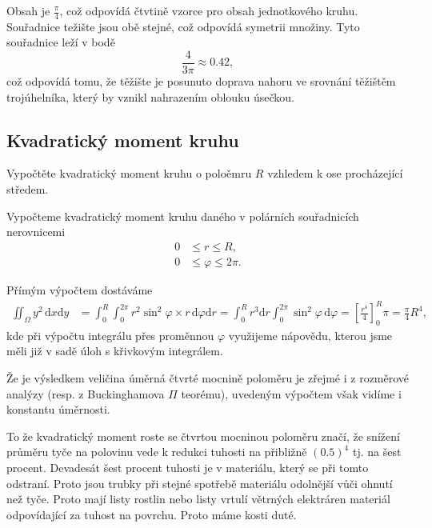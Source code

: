Obsah je $\frac \pi 4$, což odpovídá čtvtině vzorce pro obsah jednotkového kruhu. Souřadnice težište jsou obě stejné, což odpovídá symetrii množiny.  Tyto souřadnice leží v bodě
$$\frac {4}{3\pi}\approx 0.42,$$
což odpovídá tomu, že těžište je posunuto doprava nahoru ve srovnání těžištěm trojúhelníka, který by vznikl nahrazením oblouku úsečkou.

\konec

\subsection{Kvadratický moment kruhu}

Vypočtěte kvadratický moment kruhu o poloěmru $R$ vzhledem k ose procházející středem.

\reseni

Vypočteme kvadratický moment kruhu daného v polárních souřadnicích nerovnicemi
$$
\begin{aligned}
  0&\leq r\leq R,\\
  0&\leq \varphi\leq 2\pi.  
\end{aligned}
$$

Přímým výpočtem dostáváme
$$
\begin{aligned}
  \iint_{\Omega}y^2\,\mathrm dx\mathrm dy&=
  \int_{0}^R \int_0^{2\pi} r^2\sin^2\varphi \times r\,\mathrm d\varphi \mathrm dr
  =\int_{0}^R  r^3  \mathrm dr \int_0^{2\pi}\sin^2\varphi \,\mathrm d\varphi
  =\left[\frac {r^4}{4}\right]_0^R \pi
  =\frac {\pi}{4} R^4,
\end{aligned}
$$
kde při výpočtu integrálu přes proměnnou $\varphi$ využijeme nápovědu, kterou jsme měli již v sadě úloh s křivkovým integrálem.

Že je výsledkem veličina úměrná čtvrté mocnině poloměru je zřejmé i z rozměrové analýzy (resp. z Buckinghamova $\Pi$ teorému), uvedeným výpočtem však vidíme i konstantu úměrnosti.

To že kvadratický moment roste se čtvrtou mocninou poloměru značí, že snížení průměru tyče na polovinu vede k redukci tuhosti na přibližně $(0.5)^4$ tj. na šest procent. Devadesát šest procent tuhosti je v materiálu, který se při tomto odstraní. Proto jsou trubky při stejné spotřebě materiálu odolnější vůči ohnutí než tyče. Proto mají listy rostlin nebo listy vrtulí větrných elektráren materiál odpovídající za tuhost na povrchu. Proto máme kosti duté.

\konec


%


